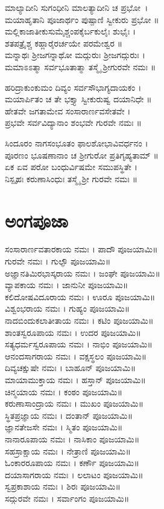 ಮಾಲ್ಯಾದೀನಿ ಸುಗಂಧೀನಿ ಮಾಲತ್ಯಾದೀನಿ ಚ ಪ್ರಭೋ~।\\
ಮಯಾಹೃತಾನಿ ಪೂಜಾರ್ಥಂ ಪುಷ್ಪಾಣಿ ಸ್ವೀಕುರು ಪ್ರಭೋ ॥\\
ಮಲ್ಲಿಕಾಜಾತೀಕುಸುಮೈಶ್ಚಂಪಕೈರ್ಬಕುಲೈಃ ಶುಭೈಃ ।\\
ಶತಪತ್ರೈಶ್ಚ ಕಹ್ಲಾರೈರರ್ಚಯೇ ಪರಮೇಶ್ವರ ॥\\
ಮನ್ನಾಥಃ ಶ್ರೀಜಗನ್ನಾಥೋ ಮದ್ಗುರುಃ ಶ್ರೀಜಗದ್ಗುರುಃ ।\\
ಮಮಾಽಽತ್ಮಾ ಸರ್ವಭೂತಾತ್ಮಾ ತಸ್ಮೈ ಶ್ರೀಗುರವೇ ನಮಃ ॥

ಹರಿದ್ರಾಕುಂಕುಮಂ ದಿವ್ಯಂ ಸರ್ವಸೌಭಾಗ್ಯದಾಯಕಂ ।\\
ಮಯಾರ್ಪಿತಂ ಚ ತೇ ಭಕ್ತ್ಯಾ ಸ್ವೀಕುರುಷ್ವ ದಯಾನಿಧೇ ॥\\
ಹೇತವೇ ಜಗತಾಮೇವ ಸಂಸಾರಾರ್ಣವಸೇತವೇ ।\\
ಪ್ರಭವೇ ಸರ್ವವಿದ್ಯಾನಾಂ ಶಂಭವೇ ಗುರವೇ ನಮಃ ॥


ಸಿಂದೂರಂ ನಾಗಸಂಭೂತಂ ಫಾಲಶೋಭಾವಿವರ್ಧನಂ ।\\
ಪೂರಣಂ ಭೂಷಣಾನಾಂ ಚ ಶ್ರೀಗುರೋ ಪ್ರತಿಗೃಹ್ಯತಾಮ್ ॥\\
ಏಕ ಏವ ಪರೋ ಬಂಧುರ್ವಿಷಮೇ ಸಮುಪಸ್ಥಿತೇ ।\\
ನಿಸ್ಪೃಹಃ ಕರುಣಾಸಿಂಧುಃ ತಸ್ಮೈ ಶ್ರೀ ಗುರವೇ ನಮಃ ॥
\newpage
\section{ಅಂಗಪೂಜಾ}
ಸಂಸಾರಾರ್ಣವತಾರಕಾಯ ನಮಃ । ಪಾದೌ ಪೂಜಯಾಮಿ॥\\
ಗುರವೇ ನಮಃ । ಗುಲ್ಫೌ ಪೂಜಯಾಮಿ॥\\
ಅಜ್ಞಾನತಿಮಿರಭಾಸ್ಕರಾಯ ನಮಃ । ಜಂಘೇ ಪೂಜಯಾಮಿ॥\\
ವ್ಯಾಪಕಾಯ ನಮಃ । ಜಾನುನೀ ಪೂಜಯಾಮಿ॥\\
ಕಲಿದೋಷವಿದೂರಾಯ ನಮಃ । ಊರೂ ಪೂಜಯಾಮಿ॥\\
ವಿಶ್ವಂಭರಾಯ ನಮಃ । ಗುಹ್ಯಂ ಪೂಜಯಾಮಿ॥\\
ನಾದಬಿಂದುಕಲಾತೀತಾಯ ನಮಃ । ಕಟಿಂ ಪೂಜಯಾಮಿ॥\\
ಶಾಂತಸ್ವರೂಪಾಯ ನಮಃ । ಉದರ ಪೂಜಯಾಮಿ॥\\
ಸತ್ಯಧರ್ಮಸ್ವರೂಪಾಯ ನಮಃ । ನಾಭಿಂ ಪೂಜಯಾಮಿ॥\\
ಆನಂದಸಾಗರಾಯ ನಮಃ । ವಕ್ಷಸ್ಥಲಂ ಪೂಜಯಾಮಿ॥\\
ದಿವ್ಯಚಕ್ಷುಷೇ ನಮಃ । ಬಾಹೂನ್ ಪೂಜಯಾಮಿ॥\\
ಮಾಯಾಮುಕ್ತಾಯ ನಮಃ । ಹಸ್ತಾನ್ ಪೂಜಯಾಮಿ॥\\
ಚಿನ್ಮಯಾಯ ನಮಃ । ಕಂಠಂ ಪೂಜಯಾಮಿ॥\\
ಕರುಣಾಸಾಂದ್ರಾಯ ನಮಃ । ಮುಖಂ ಪೂಜಯಾಮಿ॥\\
ಸ್ಥಿತಪ್ರಜ್ಞಾಯ ನಮಃ । ದಂತಾನ್ ಪೂಜಯಾಮಿ॥\\
ಜ್ಞಾನತೇಜಸೇ ನಮಃ । ಸ್ಮಿತಂ ಪೂಜಯಾಮಿ॥\\
ನಾನಾರೂಪಾಯ ನಮಃ । ನಾಸಿಕಾಂ ಪೂಜಯಾಮಿ॥\\
ಸಹಸ್ರಾಕ್ಷಾಯ ನಮಃ । ನೇತ್ರಾಣಿ ಪೂಜಯಾಮಿ॥\\
ಓಂಕಾರರೂಪಾಯ ನಮಃ । ಕರ್ಣೌ ಪೂಜಯಾಮಿ॥\\
ದಯಾಸಾಗರಾಯ ನಮಃ । ಲಲಾಟಂ ಪೂಜಯಾಮಿ॥\\
ಸ್ವಪ್ರಕಾಶಾಯ ನಮಃ । ಶಿರಃ ಪೂಜಯಾಮಿ॥\\
ಸದ್ಗುರವೇ ನಮಃ । ಸರ್ವಾಂಗಂ ಪೂಜಯಾಮಿ॥
